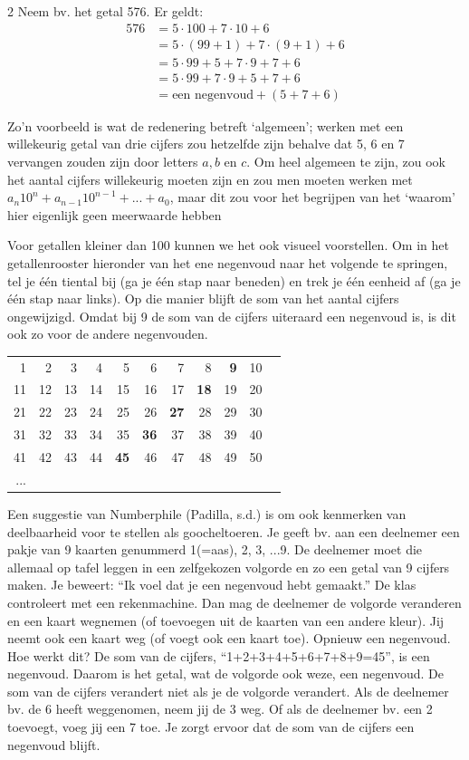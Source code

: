 \begin{multicols}{2}
Neem bv. het getal 576. Er geldt:
\begin{align}
576&=5\cdot 100+7\cdot 10+6 \nonumber\\
&=5\cdot(99+1)+7\cdot(9+1)+6 \nonumber\\
&=5\cdot99+5+7\cdot9+7+6 \nonumber\\
&=5\cdot99+7\cdot9+5+7+6 \nonumber\\
&=\text{een negenvoud}+(5+7+6)  \nonumber
\end{align}

Zo’n voorbeeld is wat de redenering betreft `algemeen'; werken met een willekeurig getal van drie cijfers zou hetzelfde zijn behalve dat 5, 6 en 7 vervangen zouden zijn door letters $a, b$ en $c$. Om heel algemeen te zijn, zou ook het aantal cijfers willekeurig moeten zijn en zou men moeten werken met $a_n 10^n+a_{n-1}10^{n-1}+...+a_0$, maar dit zou voor het begrijpen van het `waarom’ hier eigenlijk geen meerwaarde hebben

Voor getallen kleiner dan 100 kunnen we het ook visueel voorstellen. Om in het getallenrooster hieronder van het ene negenvoud naar het volgende te springen, tel je één tiental bij (ga je één stap naar beneden) en trek je één eenheid af (ga je één stap naar links). Op die manier blijft de som van het aantal cijfers ongewijzigd. Omdat bij 9 de som van de cijfers uiteraard een negenvoud is, is dit ook zo voor de andere negenvouden.

\begin{footnotesize}

\begin{tabular}{r r r r r r r r r r r}
1  &2  &3  &4  &5  &6  &7  &8  &\textbf{9}  &10\\
11 &12 &13 &14 &15 &16 &17 &\textbf{18} &19 &20\\
21 &22 &23 &24 &25 &26 &\textbf{27} &28 &29 &30\\
31 &32 &33 &34 &35 &\textbf{36} &37 &38 &39 &40\\
41 &42 &43 &44 &\textbf{45} &46 &47 &48 &49 &50\\
...
\end{tabular}
\end{footnotesize}

Een suggestie van Numberphile (Padilla, s.d.) is om ook kenmerken van deelbaarheid voor te stellen als goocheltoeren. Je geeft bv. aan een deelnemer een pakje van 9 kaarten genummerd 1(=aas), 2, 3, ...9. De deelnemer moet die allemaal op tafel leggen in een zelfgekozen volgorde en zo een getal van 9 cijfers maken. Je beweert: ``Ik voel dat je een negenvoud hebt gemaakt.'' De klas controleert met een rekenmachine. Dan mag de deelnemer de volgorde veranderen en een kaart wegnemen (of toevoegen uit de kaarten van een andere kleur). Jij neemt ook een kaart weg (of voegt ook een kaart toe). Opnieuw een negenvoud.
Hoe werkt dit? De som van de cijfers, ``1+2+3+4+5+6+7+8+9=45'', is een negenvoud. Daarom is het getal, wat de volgorde ook weze, een negenvoud. De som van de cijfers verandert niet als je de volgorde verandert. Als de deelnemer bv. de 6 heeft weggenomen, neem jij de 3 weg. Of als de deelnemer bv. een 2 toevoegt, voeg jij een 7 toe. Je zorgt ervoor dat de som van de cijfers een negenvoud blijft.


\end{multicols}
